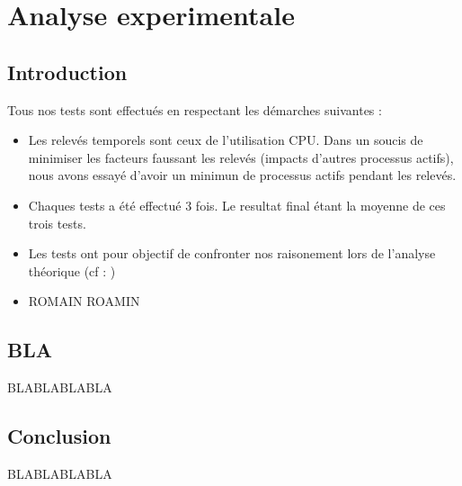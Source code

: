 \chapter{Analyse experimentale}
\section{Introduction}
Tous nos tests sont effectués en respectant les démarches suivantes : 
\begin{itemize}
\item
Les relevés temporels sont ceux de l'utilisation CPU. Dans un soucis de minimiser les facteurs faussant les relevés (impacts d'autres processus actifs), nous avons essayé d'avoir un minimun de processus actifs pendant les relevés.
\item
Chaques tests a été effectué 3 fois. Le resultat final étant la moyenne de ces trois tests.
\item
Les tests ont pour objectif de confronter nos raisonement lors de l'analyse théorique (cf : )
\item
ROMAIN ROAMIN




\end{itemize}
\section{BLA}

BLABLABLABLA



\section{Conclusion}%
BLABLABLABLA

